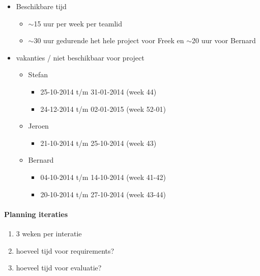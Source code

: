 \begin{itemize}
 \item Beschikbare tijd
 \begin{itemize}
  \item $\sim$15 uur per week per teamlid
  \item $\sim$30 uur gedurende het hele project voor Freek en $\sim$20 uur voor Bernard
 \end{itemize}

 
 
 \item vakanties / niet beschikbaar voor project
 \begin{itemize}
  
  \item Stefan
  \begin{itemize}
   \item 25-10-2014 t/m 31-01-2014 (week 44)
   \item 24-12-2014 t/m 02-01-2015 (week 52-01)
  \end{itemize}
 
  \item Jeroen
  \begin{itemize}
   \item 21-10-2014 t/m 25-10-2014 (week 43)
  \end{itemize}
 
  \item Bernard
   \begin{itemize}
    \item 04-10-2014 t/m 14-10-2014 (week 41-42)
    \item 20-10-2014 t/m 27-10-2014 (week 43-44)
   \end{itemize}

 \end{itemize}
\end{itemize}

\paragraph{Planning iteraties}
\begin{enumerate}
 \item 3 weken per interatie
 \item hoeveel tijd voor requirements?
 \item hoeveel tijd voor evaluatie?
\end{enumerate}